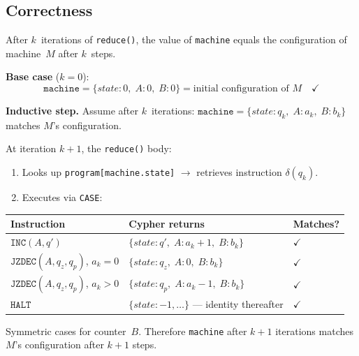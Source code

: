 \documentclass[11pt,a4paper]{article}
\begin{document}
\subsection{Correctness}

\begin{theorembox}[Claim]
After $k$~iterations of \texttt{reduce()}, the value of
\texttt{machine} equals the configuration of machine~$M$ after
$k$~steps.
\end{theorembox}

\begin{proofbox}
\textbf{Base case} ($k = 0$):
\[
  \texttt{machine} = \{state: 0,\; A: 0,\; B: 0\}
  = \text{initial configuration of } M \quad\checkmark
\]

\textbf{Inductive step.}
Assume after $k$~iterations:
$\texttt{machine} = \{state: q_k,\; A: a_k,\; B: b_k\}$
matches $M$'s configuration.

At iteration $k{+}1$, the \texttt{reduce()} body:

\begin{enumerate}[leftmargin=1.5em]
  \item Looks up \texttt{program[machine.state]} $\to$ retrieves instruction $\delta(q_k)$.
  \item Executes via \texttt{CASE}:
\end{enumerate}

\begin{center}
\small
\begin{tabular}{@{}lll@{}}
\toprule
\textbf{Instruction} & \textbf{Cypher returns} & \textbf{Matches?} \\
\midrule
$\texttt{INC}(A, q')$
  & $\{state: q',\; A: a_k + 1,\; B: b_k\}$
  & $\checkmark$ \\
$\texttt{JZDEC}(A, q_z, q_p)$, $a_k = 0$
  & $\{state: q_z,\; A: 0,\; B: b_k\}$
  & $\checkmark$ \\
$\texttt{JZDEC}(A, q_z, q_p)$, $a_k > 0$
  & $\{state: q_p,\; A: a_k - 1,\; B: b_k\}$
  & $\checkmark$ \\
$\texttt{HALT}$
  & $\{state: -1, \ldots\}$ --- identity thereafter
  & $\checkmark$ \\
\bottomrule
\end{tabular}
\end{center}

Symmetric cases for counter~$B$.
Therefore \texttt{machine} after $k{+}1$ iterations matches $M$'s
configuration after $k{+}1$ steps.
\end{proofbox}
\end{document}
